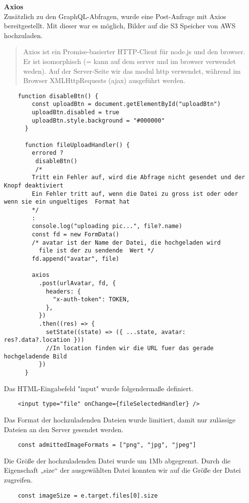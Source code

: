 \newpage
\textbf{Axios} \\
Zusätzlich zu den GraphQL-Abfragen, wurde eine Post-Anfrage mit Axios bereitgestellt.
Mit dieser war es möglich, Bilder auf die S3 Speicher von AWS hochzuladen.

\begin{quote}
Axios ist ein Promise-basierter HTTP-Client für node.js und den browser. Er ist isomorphisch (= kann auf dem server und im browser verwendet weden). Auf der Server-Seite wir das modul http verwendet, während im Browser XMLHttpRequests (ajax) ausgeführt werden.
\end{quote}

\begin{lstlisting}
    function disableBtn() {
        const uploadBtn = document.getElementById("uploadBtn")
        uploadBtn.disabled = true
        uploadBtn.style.background = "#000000"
      }
    
      function fileUploadHandler() {
        errored ? 
         disableBtn()
         /*
        Tritt ein Fehler auf, wird die Abfrage nicht gesendet und der Knopf deaktiviert 
        Ein Fehler tritt auf, wenn die Datei zu gross ist oder oder wenn sie ein ungueltiges  Format hat
        */
        :
        console.log("uploading pic...", file?.name)
        const fd = new FormData()
        /* avatar ist der Name der Datei, die hochgeladen wird
          file ist der zu sendende  Wert */
        fd.append("avatar", file)  
    
        axios
          .post(urlAvatar, fd, {
            headers: {
              "x-auth-token": TOKEN,
            },
          })
          .then((res) => {
            setState((state) => ({ ...state, avatar: res?.data?.location }))    
            //In location finden wir die URL fuer das gerade hochgeladende Bild 
          })
      }\end{lstlisting}

Das HTML-Eingabefeld "input" wurde folgendermaße definiert.
\begin{lstlisting}
    <input type="file" onChange={fileSelectedHandler} />
\end{lstlisting}


Das Format der hochzuladenden Dateien wurde limitiert, damit nur zulässige Dateien an den Server gesendet werden.
\begin{lstlisting}
    const admittedImageFormats = ["png", "jpg", "jpeg"]
\end{lstlisting}

Die Größe der hochzuladenden Datei wurde um 1Mb abgegrenzt.
Durch die Eigenschaft „size“ der ausgewählten Datei konnten wir auf die Größe der Datei zugreifen.
\begin{lstlisting}
    const imageSize = e.target.files[0].size
\end{lstlisting}